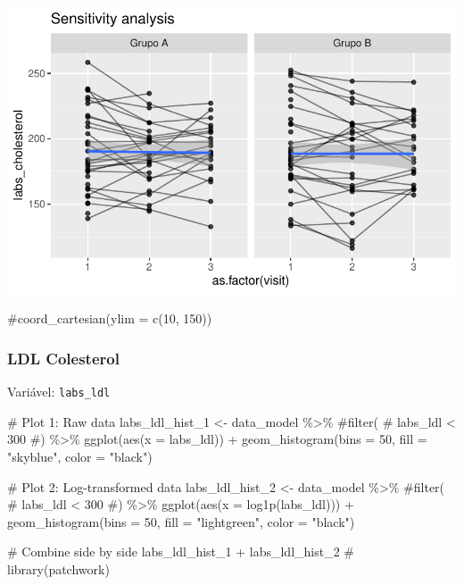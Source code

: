 \documentclass[
  letterpaper,
  DIV=11,
  numbers=noendperiod]{scrartcl}
\newenvironment{Shaded}{\begin{snugshade}}{\end{snugshade}}
\newcommand{\AttributeTok}[1]{\textcolor[rgb]{0.40,0.45,0.13}{#1}}
\newcommand{\CommentTok}[1]{\textcolor[rgb]{0.37,0.37,0.37}{#1}}
\newcommand{\DecValTok}[1]{\textcolor[rgb]{0.68,0.00,0.00}{#1}}
\newcommand{\FunctionTok}[1]{\textcolor[rgb]{0.28,0.35,0.67}{#1}}
\newcommand{\NormalTok}[1]{\textcolor[rgb]{0.00,0.23,0.31}{#1}}
\newcommand{\OtherTok}[1]{\textcolor[rgb]{0.00,0.23,0.31}{#1}}
\newcommand{\SpecialCharTok}[1]{\textcolor[rgb]{0.37,0.37,0.37}{#1}}
\newcommand{\StringTok}[1]{\textcolor[rgb]{0.13,0.47,0.30}{#1}}
\begin{document}
\includegraphics{Outcomes_V1V2V3_files/figure-pdf/labs_cholesterol_6-2.pdf}

\begin{Shaded}
\begin{Highlighting}[]
    \CommentTok{\#coord\_cartesian(ylim = c(10, 150))}
\end{Highlighting}
\end{Shaded}

\subsubsection{LDL Colesterol}\label{ldl-colesterol}

Variável: \texttt{labs\_ldl}

\begin{Shaded}
\begin{Highlighting}[]
\CommentTok{\# Plot 1: Raw data}
\NormalTok{labs\_ldl\_hist\_1 }\OtherTok{\textless{}{-}}\NormalTok{ data\_model }\SpecialCharTok{\%\textgreater{}\%} 
    \CommentTok{\#filter(}
    \CommentTok{\#    labs\_ldl \textless{} 300}
    \CommentTok{\#) \%\textgreater{}\% }
    \FunctionTok{ggplot}\NormalTok{(}\FunctionTok{aes}\NormalTok{(}\AttributeTok{x =}\NormalTok{ labs\_ldl)) }\SpecialCharTok{+} 
    \FunctionTok{geom\_histogram}\NormalTok{(}\AttributeTok{bins =} \DecValTok{50}\NormalTok{, }\AttributeTok{fill =} \StringTok{"skyblue"}\NormalTok{, }\AttributeTok{color =} \StringTok{"black"}\NormalTok{)}

\CommentTok{\# Plot 2: Log{-}transformed data}
\NormalTok{labs\_ldl\_hist\_2 }\OtherTok{\textless{}{-}}\NormalTok{ data\_model }\SpecialCharTok{\%\textgreater{}\%} 
    \CommentTok{\#filter(}
    \CommentTok{\#    labs\_ldl \textless{} 300}
    \CommentTok{\#) \%\textgreater{}\%}
    \FunctionTok{ggplot}\NormalTok{(}\FunctionTok{aes}\NormalTok{(}\AttributeTok{x =} \FunctionTok{log1p}\NormalTok{(labs\_ldl))) }\SpecialCharTok{+} 
    \FunctionTok{geom\_histogram}\NormalTok{(}\AttributeTok{bins =} \DecValTok{50}\NormalTok{, }\AttributeTok{fill =} \StringTok{"lightgreen"}\NormalTok{, }\AttributeTok{color =} \StringTok{"black"}\NormalTok{)}

\CommentTok{\# Combine side by side}
\NormalTok{labs\_ldl\_hist\_1 }\SpecialCharTok{+}\NormalTok{ labs\_ldl\_hist\_2 }\CommentTok{\# library(patchwork)}
\end{Highlighting}
\end{Shaded}
\end{document}
